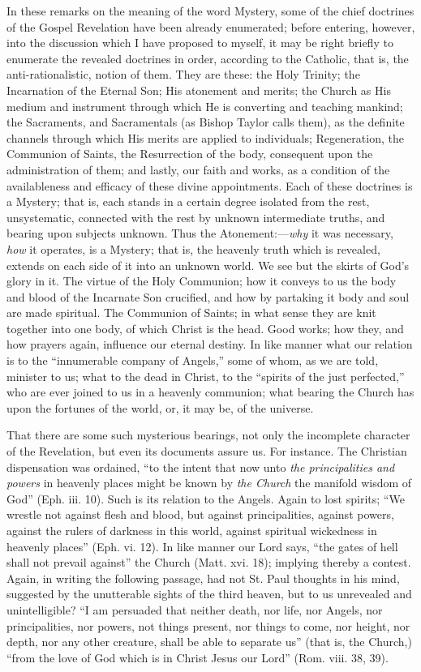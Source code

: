 In these remarks on the meaning of the word
Mystery, some of the chief doctrines of the Gospel Revelation have
been already enumerated; before entering, however, into the discussion
which I have proposed to myself, it may be right briefly to enumerate
the revealed doctrines in order, according to the Catholic, that is,
the anti-rationalistic, notion of them. They are these: the Holy
Trinity; the Incarnation of the Eternal Son; His atonement and merits;
the Church as His medium and instrument through which He is converting
and teaching mankind; the Sacraments, and Sacramentals (as Bishop
Taylor calls them), as the definite channels through which His merits
are applied to individuals; Regeneration, the Communion of Saints, the
Resurrection of the body, consequent upon the administration of them;
and lastly, our faith and works, as a condition of the availableness
and efficacy of these divine appointments. Each of these doctrines is
a Mystery; that is, each stands in a certain degree isolated from the
rest, unsystematic, connected with the rest by unknown intermediate
truths, and bearing upon subjects unknown. Thus the Atonement:—\emph{why}
it was necessary, \emph{how} it operates, is a Mystery; that is, the
heavenly truth which is revealed, extends on each side of it into an
unknown world. We see but the skirts of God's glory in it. The virtue
of the Holy Communion; how it conveys to us the body and blood of
the Incarnate Son crucified, and how by partaking it body and soul are
made spiritual. The Communion of Saints; in what sense they are knit
together into one body, of which Christ is the head. Good works; how
they, and how prayers again, influence our eternal destiny. In like
manner what our relation is to the ``innumerable company of
Angels,'' some of whom, as we are told, minister to us; what to the
dead in Christ, to the ``spirits of the just perfected,'' who are
ever joined to us in a heavenly communion; what bearing the Church has
upon the fortunes of the world, or, it may be, of the universe.

That there are some such mysterious bearings, not
only the incomplete character of the Revelation, but even its
documents assure us. For instance. The Christian dispensation was
ordained, ``to the intent that now unto \emph{the principalities and
powers} in heavenly places might be known by \emph{the Church} the
manifold wisdom of God'' (Eph. iii. 10). Such is its relation to the
Angels. Again to lost spirits; ``We wrestle not against flesh and
blood, but against principalities, against powers, against the rulers
of darkness in this world, against spiritual wickedness in heavenly
places'' (Eph. vi. 12). In like manner our Lord says, ``the gates of
hell shall not prevail against'' the Church (Matt. xvi. 18); implying
thereby a contest. Again, in writing the following passage, had not
St. Paul thoughts in his mind, suggested by the unutterable sights of
the third heaven, but to us unrevealed and unintelligible? ``I am
persuaded that neither death, nor life, nor Angels, nor
principalities, nor powers, not things present, nor things to come,
nor height, nor depth, nor any other creature, shall be able to
separate us'' (that is, the Church,) ``from the love of God which is
in Christ Jesus our Lord'' (Rom. viii. 38, 39).

